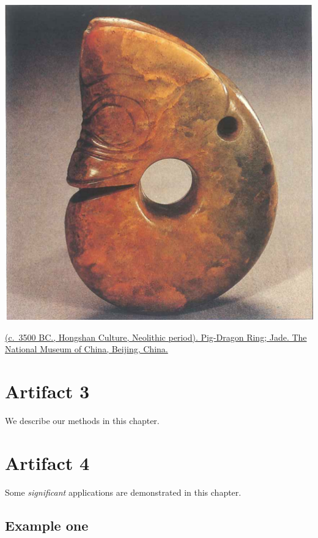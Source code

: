 \documentclass[
]{book}
\begin{document}
\includegraphics[width=1\textwidth,height=\textheight]{images/1. Jade_Pig_Dragon.png}

\href{}{(c.~3500 BC., Hongshan Culture, Neolithic period). Pig-Dragon Ring; Jade. The National Museum of China, Beijing, China.}

\hypertarget{artifact3}{%
\chapter*{Artifact 3}\label{artifact3}}

We describe our methods in this chapter.

\hypertarget{artifact4}{%
\chapter*{Artifact 4}\label{artifact4}}

Some \emph{significant} applications are demonstrated in this chapter.

\hypertarget{example-one}{%
\section{Example one}\label{example-one}}
\end{document}
